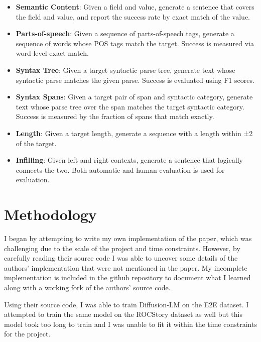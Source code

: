 \begin{itemize}
\item \textbf{Semantic Content}: Given a field and value, generate a sentence that covers the field and value, and report the success rate by exact match of the value.
\item \textbf{Parts-of-speech}: Given a sequence of parts-of-speech tags, generate a sequence of words whose POS tags match the target. Success is measured via word-level exact match.
\item \textbf{Syntax Tree}: Given a target syntactic parse tree, generate text whose syntactic parse matches the given parse. Success is evaluated using F1 scores.
\item \textbf{Syntax Spans}: Given a target pair of span and syntactic category, generate text whose parse tree over the span matches the target syntactic category. Success is measured by the fraction of spans that match exactly.
\item \textbf{Length}: Given a target length, generate a sequence with a length within ±2 of the target.
\item \textbf{Infilling}: Given left and right contexts, generate a sentence that logically connects the two. Both automatic and human evaluation is used for evaluation.
\end{itemize}

\section{Methodology}


I began by attempting to write my own implementation of the paper, which was challenging due to the scale of the project and time constraints. However, by carefully reading their source code I was able to uncover some details of the authors' implementation that were not mentioned in the paper. My incomplete implementation is included in the github repository to document what I learned along with a working fork of the authors' source code.

Using their source code, I was able to train Diffusion-LM on the E2E dataset. I attempted to train the same model on the ROCStory dataset as well but this model took too long to train and I was unable to fit it within the time constraints for the project.

